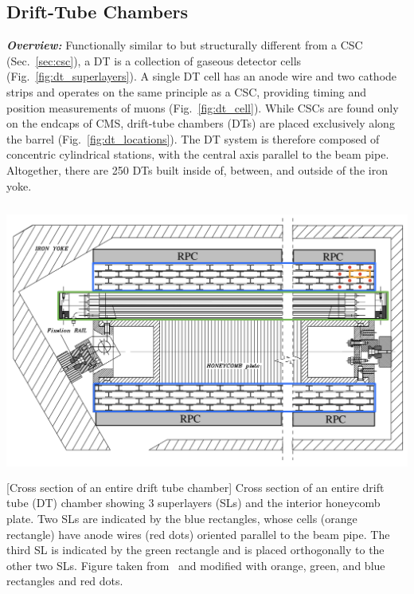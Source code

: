 \subsection{Drift-Tube Chambers}
\label{sec:dt}

\textbf{\textit{Overview:}}
Functionally similar to but structurally different from a CSC (Sec.~\ref{sec:csc}), a DT is a collection of gaseous detector cells (Fig.~\ref{fig:dt_superlayers}).
A single DT cell has an anode wire and two cathode strips and operates on the same principle as a CSC, providing timing and position measurements of muons (Fig.~\ref{fig:dt_cell}).
While CSCs are found only on the endcaps of CMS, drift-tube chambers (DTs) are placed exclusively along the barrel (Fig.~\ref{fig:dt_locations}).
The DT system is therefore composed of concentric cylindrical stations, with the central axis parallel to the beam pipe.
Altogether, there are 250 DTs built inside of, between, and outside of the iron yoke.
\begin{multiFigure}
    \centering
    \includegraphics[height=9cm,keepaspectratio]{figures/cms/muonsys/drifttube_superlayers.jpeg}
        [Cross section of an entire drift tube chamber]
        {Cross section of an entire drift tube (DT) chamber showing 3 superlayers (SLs) and the interior honeycomb plate.
        Two SLs are indicated by the blue rectangles, whose cells (orange rectangle) have anode wires (red dots) oriented parallel to the beam pipe.
        The third SL is indicated by the green rectangle and is placed orthogonally to the other two SLs.
        Figure taken from~\cite{collaboration_cms_2008} and modified with orange, green, and blue rectangles and red dots.
        }
    \label{fig:dt_superlayers}
\end{multiFigure}
